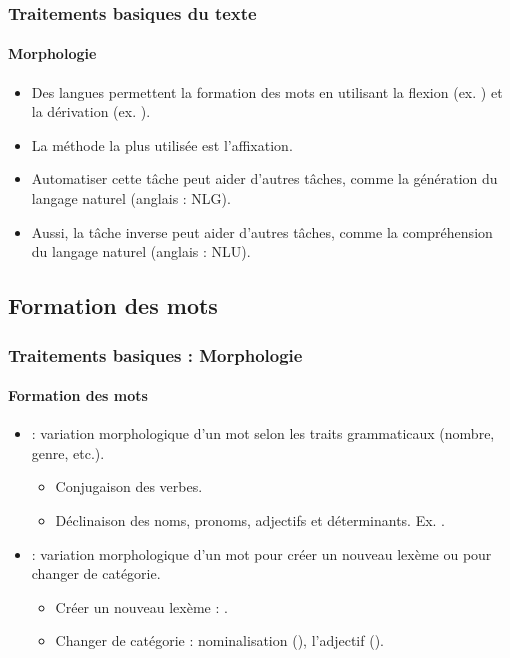 \documentclass[xcolor=table]{beamer}
\begin{document}
\begin{frame}
\frametitle{Traitements basiques du texte}
\framesubtitle{Morphologie}

\begin{itemize}
	\item Des langues permettent la formation des mots en utilisant la flexion (ex. ) et la dérivation (ex. ).
	\item La  méthode la plus utilisée est l'affixation.
	\item Automatiser cette tâche peut aider d'autres tâches, comme la génération du langage naturel (anglais : NLG).
	\item Aussi, la tâche inverse peut aider d'autres tâches, comme la compréhension du langage naturel (anglais : NLU).
\end{itemize}

\end{frame}

\subsection{Formation des mots}

\begin{frame}
\frametitle{Traitements basiques : Morphologie}
\framesubtitle{Formation des mots}
\begin{itemize}
	\item {} : variation morphologique d'un mot selon les traits grammaticaux (nombre, genre, etc.).
	\begin{itemize}
		\item Conjugaison des verbes.
		\item Déclinaison des noms, pronoms, adjectifs et déterminants. 
		Ex. .
	\end{itemize}
	\item {} : variation morphologique d'un mot pour créer un nouveau lexème ou pour changer de catégorie.
	\begin{itemize}
		\item Créer un nouveau lexème : .
		\item Changer de catégorie : nominalisation (), l'adjectif ().
	\end{itemize}
\end{itemize}

\end{frame}
\end{document}
